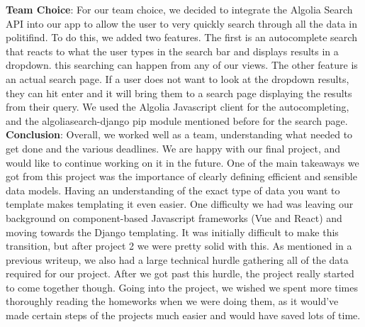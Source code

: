 \documentclass{article}
\newcommand{\n}{\noindent}
\begin{document}
\n\textbf{Team Choice}: For our team choice, we decided to integrate the Algolia Search API into our app to allow the user to very quickly search through all the data in politifind. To do this, we added two features. The first is an autocomplete search that reacts to what the user types in the search bar and displays results in a dropdown. this searching can happen from any of our views. The other feature is an actual search page. If a user does not want to look at the dropdown results, they can hit enter and it will bring them to a search page displaying the results from their query. We used the Algolia Javascript client for the autocompleting, and the algoliasearch-django pip module mentioned before for the search page. \\

\n\textbf{Conclusion}: Overall, we worked well as a team, understanding what needed to get done and the various deadlines. We are happy with our final project, and would like to continue working on it in the future. One of the main takeaways we got from this project was the importance of clearly defining efficient and sensible data models. Having an understanding of the exact type of data you want to template makes templating it even easier. One difficulty we had was leaving our background on component-based Javascript frameworks (Vue and React) and moving towards the Django templating. It was initially difficult to make this transition, but after project 2 we were pretty solid with this. As mentioned in a previous writeup, we also had a large technical hurdle gathering all of the data required for our project. After we got past this hurdle, the project really started to come together though. Going into the project, we wished we spent more times thoroughly reading the homeworks when we were doing them, as it would've made certain steps of the projects much easier and would have saved lots of time. \\
\end{document}
